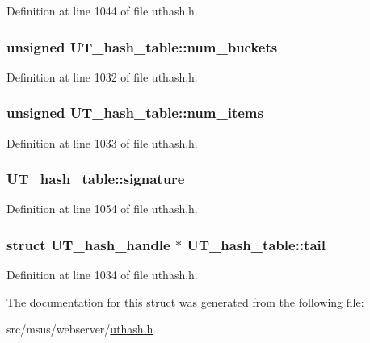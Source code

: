 Definition at line 1044 of file uthash.\-h.

\hypertarget{struct_u_t__hash__table_a3ed04b6233facaedf910672578d86339}{
\subsubsection[{num\-\_\-buckets}]{\setlength{\rightskip}{0pt plus 5cm}unsigned U\-T\-\_\-hash\-\_\-table\-::num\-\_\-buckets}}\label{struct_u_t__hash__table_a3ed04b6233facaedf910672578d86339}


Definition at line 1032 of file uthash.\-h.

\hypertarget{struct_u_t__hash__table_a74534cc14f080c96f94d8f5da83d9d76}{
\subsubsection[{num\-\_\-items}]{\setlength{\rightskip}{0pt plus 5cm}unsigned U\-T\-\_\-hash\-\_\-table\-::num\-\_\-items}}\label{struct_u_t__hash__table_a74534cc14f080c96f94d8f5da83d9d76}


Definition at line 1033 of file uthash.\-h.

\hypertarget{struct_u_t__hash__table_a87d1ab3f3ede1809c6a485972d20b25f}{
\subsubsection[{signature}]{ U\-T\-\_\-hash\-\_\-table\-::signature}}\label{struct_u_t__hash__table_a87d1ab3f3ede1809c6a485972d20b25f}


Definition at line 1054 of file uthash.\-h.

\hypertarget{struct_u_t__hash__table_a00c43ffe6c1545c3f1729acbd7b0ef83}{
\subsubsection[{tail}]{\setlength{\rightskip}{0pt plus 5cm}struct {\bf U\-T\-\_\-hash\-\_\-handle} $\ast$ U\-T\-\_\-hash\-\_\-table\-::tail}}\label{struct_u_t__hash__table_a00c43ffe6c1545c3f1729acbd7b0ef83}


Definition at line 1034 of file uthash.\-h.



The documentation for this struct was generated from the following file\-:\begin{DoxyCompactItemize}
\item 
src/msus/webserver/\hyperlink{msus_2webserver_2uthash_8h}{uthash.\-h}\end{DoxyCompactItemize}
